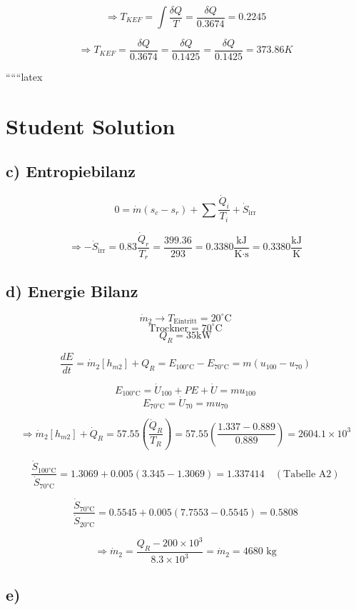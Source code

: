 \[
\Rightarrow T_{KEF} = \int \frac{\delta Q}{T} = \frac{\delta Q}{0.3674} = 0.2245
\]

\[
\Rightarrow T_{KEF} = \frac{\delta Q}{0.3674} = \frac{\delta Q}{0.1425} = \frac{\delta Q}{0.1425} = 373.86 K
\]

``````latex


\section*{Student Solution}

\subsection*{c) Entropiebilanz}

\[
0 = \dot{m} \left( s_c - s_r \right) + \sum \frac{\dot{Q}_i}{T_i} + \dot{S}_{\text{irr}}
\]

\[
\Rightarrow -\dot{S}_{\text{irr}} = 0.83 \frac{\dot{Q}_r}{T_r} = \frac{399.36}{293} = 0.3380 \frac{\text{kJ}}{\text{K} \cdot \text{s}} = 0.3380 \frac{\text{kJ}}{\text{K}}
\]

\subsection*{d) Energie Bilanz}

\[
\dot{m}_2 \rightarrow T_{\text{Eintritt}} = 20^\circ \text{C}
\]
\[
\text{Trockner} = 70^\circ \text{C}
\]
\[
Q_R = 35 \text{kW}
\]

\[
\frac{dE}{dt} = \dot{m}_2 \left[ h_{m2} \right] + Q_R = E_{\text{100°C}} - E_{\text{70°C}} = m \left( u_{100} - u_{70} \right)
\]

\[
E_{\text{100°C}} = \dot{U}_{100} + PE + \dot{U} = m u_{100}
\]
\[
E_{\text{70°C}} = \dot{U}_{70} = m u_{70}
\]

\[
\Rightarrow \dot{m}_2 \left[ h_{m2} \right] + \dot{Q}_R = 57.55 \left( \frac{\dot{Q}_R}{T_R} \right) = 57.55 \left( \frac{1.337 - 0.889}{0.889} \right) = 2604.1 \times 10^3
\]

\[
\frac{\dot{S}_{\text{100°C}}}{\dot{S}_{\text{70°C}}} = 1.3069 + 0.005 \left( 3.345 - 1.3069 \right) = 1.337414 \quad (\text{Tabelle A2})
\]

\[
\frac{\dot{S}_{\text{70°C}}}{\dot{S}_{\text{20°C}}} = 0.5545 + 0.005 \left( 7.7553 - 0.5545 \right) = 0.5808
\]

\[
\Rightarrow \dot{m}_2 = \frac{Q_R - 200 \times 10^3}{8.3 \times 10^3} = \dot{m}_2 = 4680 \text{ kg}
\]

\subsection*{e)}

